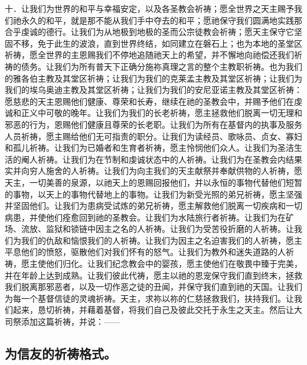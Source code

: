 十．让我们为世界的和平与幸福安定，以及各圣教会祈祷；愿全世界之天主赐予我们祂永久的和平，就是那不能从我们手中夺去的和平；愿祂保守我们圆满地实践那合乎虔诚的德行。让我们为从地极到地极的圣而公宗徒教会祈祷；愿天主保守它坚固不移，免于此生的波浪，直到世界终结，如同建立在磐石上；也为本地的圣堂区祈祷，愿全世界的主恩赐我们不停地追随祂天上的希望，并不懈地向祂偿还我们祈祷的债务。让我们为所有普天下正确分施祢真理之言的整个主教职祈祷。也为我们的雅各伯主教及其堂区祈祷；让我们为我们的克莱孟主教及其堂区祈祷；让我们为我们的埃乌奥迪主教及其堂区祈祷；让我们为我们的安尼亚诺主教及其堂区祈祷：愿慈悲的天主恩赐他们健康、尊荣和长寿，继续在祂的圣教会中，并赐予他们在虔诚和正义中可敬的晚年。让我们为我们的长老祈祷，愿主拯救他们脱离一切无理和邪恶的行为，恩赐他们健康且尊荣的长老职。让我们为所有在基督内的执事及服务人员祈祷，愿主赐给他们无可指责的职分。让我们为读经员、歌咏员、贞女、寡妇和孤儿祈祷。让我们为已婚者和生育者祈祷，愿主怜悯他们众人。让我们为圣洁生活的阉人祈祷。让我们为在节制和虔诚状态中的人祈祷。让我们为在圣教会内结果实并向穷人施舍的人祈祷。让我们为向主我们的天主献祭并奉献供物的人祈祷，愿天主，一切美善的泉源，以祂天上的恩赐回报他们，并以永恒的事物代替他们短暂的事物，以天上的事物代替地上的事物。让我们为新受光照的弟兄祈祷，愿主坚强并坚固他们。让我们为患病受试炼的弟兄祈祷，愿主解救他们脱离一切疾病和一切病患，并使他们痊愈回到祂的圣教会。让我们为水陆旅行者祈祷。让我们为在矿场、流放、监狱和锁链中因主之名的人祈祷。让我们为受苦役折磨的人祈祷。让我们为我们的仇敌和恼恨我们的人祈祷。让我们为因主之名迫害我们的人祈祷，愿主平息他们的愤怒，驱散他们对我们怀有的怒气。让我们为教外和迷失道路的人祈祷，愿主使他们归化。让我们纪念教会中的婴孩，愿主使他们在敬畏中臻于完美，并在年龄上达到成熟。让我们彼此代祷，愿主以祂的恩宠保守我们直到终末，拯救我们脱离那邪恶者，以及一切作恶之徒的丑闻，并保守我们直到祂的天国。让我们为每一个基督信徒的灵魂祈祷。天主，求祢以祢的仁慈拯救我们，扶持我们。让我们起来，恳切祈祷，并藉着基督，将我们自己及彼此交托于永生之天主。然后让大司祭添加这篇祈祷，并说：——\par


\subsection{为信友的祈祷格式。}

